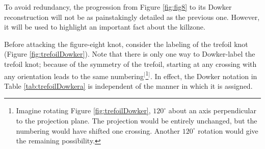 \documentclass[titlepage]{article}
\begin{document}
\noindent To avoid redundancy, the progression from Figure \ref{fig:fig8} to its Dowker reconstruction will not be as painstakingly detailed as the previous one. However, it will be used to highlight an important fact about the killzone.\par
Before attacking the figure-eight knot, consider the labeling of the trefoil knot (Figure \ref{fig:trefoilDowker}). Note that there is only one way to Dowker-label the trefoil knot; because of the symmetry of the trefoil, starting at any crossing with any orientation leads to the same numbering$^[$\footnote{Imagine rotating Figure \ref{fig:trefoilDowker}, $120^\circ$ about an axis perpendicular to the projection plane. The projection would be entirely unchanged, but the numbering would have shifted one crossing. Another $120^\circ$ rotation would give the remaining possibility.}$^]$. In effect, the Dowker notation in Table \ref{tab:trefoilDowkera} is independent of the manner in which it is assigned.\par
\end{document}
